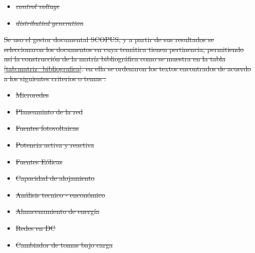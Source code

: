 \documentclass[12pt, letterpaper]{report}
\providecommand{\DIFdeltex}[1]{{\protect\color{red}\sout{#1}}}                      %
\providecommand{\DIFdel}[1]{\texorpdfstring{\DIFdeltex{#1}}{}} %
\begin{document}
 \begin{itemize} %
\item%
\textit{\DIFdel{control voltage}}
\item%
\textit{\DIFdel{distributied generation}}

 \end{itemize} %

\DIFdel{Se uso el gestor documental SCOPUS, y  a partir de sus resultados se seleccionaron los documentos en cuya temática tienen pertinencia, permitiendo así la construcción de la matríz bibliográfica como se muestra en la tabla \ref{tab:matriz_bibliografica}. en ella se ordenaron los textos encontrados de acuerdo a los siguientes criterios o temas :}%

 \begin{itemize} %
\item%
\DIFdel{Microredes
	}%
\item%
\DIFdel{Planeaminto de la red
	}%
\item%
\DIFdel{Fuentes fotovoltaicas
	}%
\item%
\DIFdel{Potencia activa y reactiva
	}%
\item%
\DIFdel{Fuentes Eólicas
	}%
\item%
\DIFdel{Capacidad de alojamiento
	}%
\item%
\DIFdel{Análisis tecnico - enconómico
	}%
\item%
\DIFdel{Almacenamiento de energía
	}%
\item%
\DIFdel{Redes en DC
	}%
\item%
\DIFdel{Cambiador de tomas bajo carga
}
 \end{itemize} %
\end{document}
